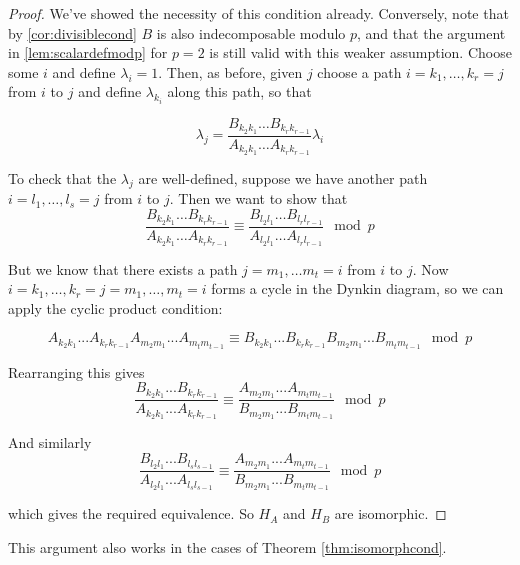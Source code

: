 \documentclass[11pt,a4paper]{report}
\theoremstyle{definition}
\begin{document}
\begin{proof}
    We've showed the necessity of this condition already. Conversely, note that by \ref{cor:divisiblecond} $B$ is also indecomposable modulo $p$, and that the argument in \ref{lem:scalardefmodp} for $p = 2$ is still valid with this weaker assumption. Choose some $i$ and define $\lambda_i = 1$. Then, as before, given $j$ choose a path $i = k_1, \ldots, k_r = j$ from $i$ to $j$ and define $\lambda_{k_i}$ along this path, so that 

    \begin{equation*}\lambda_j = \dfrac{B_{k_2 k_1} \ldots B_{k_r k_{r-1}}}{A_{k_2k_1} \ldots A_{k_r k_{r-1}}} \lambda_i\end{equation*}

    To check that the $\lambda_j$ are well-defined, suppose we have another path $i = l_1, \ldots, l_s = j$ from $i$ to $j$. Then we want to show that \begin{equation*}\dfrac{B_{k_2 k_1} \ldots B_{k_r k_{r-1}}}{A_{k_2k_1} \ldots A_{k_r k_{r-1}}} \equiv \dfrac{B_{l_2 l_1} \ldots B_{l_r l_{r-1}}}{A_{l_2l_1} \ldots A_{l_r l_{r-1}}} \mod p\end{equation*}

    But we know that there exists a path $j = m_1, \ldots m_t = i$ from $i$ to $j$. Now $i = k_1, \ldots, k_r = j = m_1, \ldots, m_t = i$ forms a cycle in the Dynkin diagram, so we can apply the cyclic product condition:

    \begin{equation*}A_{k_2k_1} ... A_{k_r k_{r-1}} A_{m_2m_1} ... A_{m_t m_{t-1}} \equiv B_{k_2k_1} ... B_{k_r k_{r-1}} B_{m_2m_1} ... B_{m_t m_{t-1}} \mod p\end{equation*}

    Rearranging this gives \begin{equation*}\dfrac{B_{k_2k_1} ... B_{k_r k_{r-1}}}{A_{k_2k_1} ... A_{k_r k_{r-1}}} \equiv \dfrac{A_{m_2m_1} ... A_{m_t m_{t-1}}}{B_{m_2m_1} ... B_{m_t m_{t-1}}} \mod p \end{equation*}

    And similarly \begin{equation*}\dfrac{B_{l_2l_1} ... B_{l_s l_{s-1}}}{A_{l_2l_1} ... A_{l_s l_{s-1}}} \equiv \dfrac{A_{m_2m_1} ... A_{m_t m_{t-1}}}{B_{m_2m_1} ... B_{m_t m_{t-1}}} \mod p \end{equation*}

    which gives the required equivalence. So $H_A$ and $H_B$ are isomorphic. 
\end{proof}
This argument also works in the cases of Theorem \ref{thm:isomorphcond}. 
\end{document}
